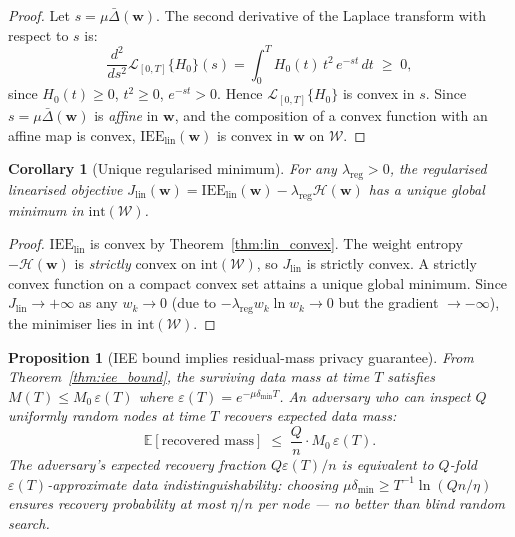 \documentclass[review,12pt]{elsarticle}
\newcommand{\bfw}{\mathbf{w}}
\newcommand{\IEE}{\mathrm{IEE}}
\newtheorem{proposition}{Proposition}
\newtheorem{corollary}{Corollary}
\begin{document}
\begin{proof}
Let $s = \mu\bar{\Delta}(\bfw)$.  The second derivative of the Laplace transform
with respect to $s$ is:
\begin{equation}
  \frac{d^2}{ds^2}\mathcal{L}_{[0,T]}\{H_0\}(s)
  = \int_0^T H_0(t)\,t^2\,e^{-st}\,dt \;\geq\; 0,
  \label{eq:laplace_convex}
\end{equation}
since $H_0(t)\geq 0$, $t^2\geq 0$, $e^{-st}>0$.  Hence
$\mathcal{L}_{[0,T]}\{H_0\}$ is convex in $s$.
Since $s = \mu\bar{\Delta}(\bfw)$ is \emph{affine} in $\bfw$, and the composition
of a convex function with an affine map is convex,
$\IEE_{\mathrm{lin}}(\bfw)$ is convex in $\bfw$ on $\mathcal{W}$.
\end{proof}

\begin{corollary}[Unique regularised minimum]
\label{cor:unique}
For any $\lambda_{\mathrm{reg}} > 0$, the regularised linearised objective
$J_{\mathrm{lin}}(\bfw) = \IEE_{\mathrm{lin}}(\bfw) - \lambda_{\mathrm{reg}}\mathcal{H}(\bfw)$
has a unique global minimum in $\mathrm{int}(\mathcal{W})$.
\end{corollary}

\begin{proof}
$\IEE_{\mathrm{lin}}$ is convex by Theorem~\ref{thm:lin_convex}.
The weight entropy $-\mathcal{H}(\bfw)$ is \emph{strictly} convex on
$\mathrm{int}(\mathcal{W})$, so $J_{\mathrm{lin}}$ is strictly convex.
A strictly convex function on a compact convex set attains a unique
global minimum.  Since $J_{\mathrm{lin}} \to +\infty$ as any
$w_k \to 0$ (due to $-\lambda_{\mathrm{reg}} w_k \ln w_k \to 0$ but
the gradient $\to -\infty$), the minimiser lies in
$\mathrm{int}(\mathcal{W})$.
\end{proof}

\begin{proposition}[IEE bound implies residual-mass privacy guarantee]
\label{prop:privacy}
From Theorem~\ref{thm:iee_bound}, the surviving data mass at time $T$
satisfies $M(T) \leq M_0\,\varepsilon(T)$ where
$\varepsilon(T) = e^{-\mu\delta_{\min}T}$.
An adversary who can inspect $Q$ uniformly random nodes at time $T$
recovers expected data mass:
\begin{equation}
  \mathbb{E}[\text{recovered mass}] \;\leq\;
    \frac{Q}{n}\cdot M_0\,\varepsilon(T).
  \label{eq:mass_recovery}
\end{equation}
The adversary's expected \emph{recovery fraction} $Q\varepsilon(T)/n$
is equivalent to $Q$-fold $\varepsilon(T)$-approximate data indistinguishability:
choosing $\mu\delta_{\min} \geq T^{-1}\ln(Qn/\eta)$ ensures recovery
probability at most $\eta/n$ per node --- no better than blind random search.
\end{proposition}
\end{document}
